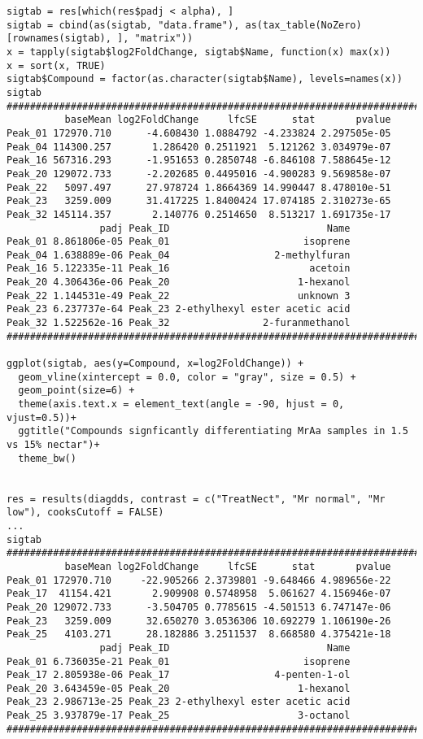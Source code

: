 \documentclass[]{article}
\begin{document}
\begin{verbatim}
sigtab = res[which(res$padj < alpha), ]
sigtab = cbind(as(sigtab, "data.frame"), as(tax_table(NoZero)[rownames(sigtab), ], "matrix"))
x = tapply(sigtab$log2FoldChange, sigtab$Name, function(x) max(x))
x = sort(x, TRUE)
sigtab$Compound = factor(as.character(sigtab$Name), levels=names(x))
sigtab
######################################################################################################
          baseMean log2FoldChange     lfcSE      stat       pvalue
Peak_01 172970.710      -4.608430 1.0884792 -4.233824 2.297505e-05
Peak_04 114300.257       1.286420 0.2511921  5.121262 3.034979e-07
Peak_16 567316.293      -1.951653 0.2850748 -6.846108 7.588645e-12
Peak_20 129072.733      -2.202685 0.4495016 -4.900283 9.569858e-07
Peak_22   5097.497      27.978724 1.8664369 14.990447 8.478010e-51
Peak_23   3259.009      31.417225 1.8400424 17.074185 2.310273e-65
Peak_32 145114.357       2.140776 0.2514650  8.513217 1.691735e-17
                padj Peak_ID                           Name
Peak_01 8.861806e-05 Peak_01                       isoprene
Peak_04 1.638889e-06 Peak_04                  2-methylfuran
Peak_16 5.122335e-11 Peak_16                        acetoin
Peak_20 4.306436e-06 Peak_20                      1-hexanol
Peak_22 1.144531e-49 Peak_22                      unknown 3
Peak_23 6.237737e-64 Peak_23 2-ethylhexyl ester acetic acid
Peak_32 1.522562e-16 Peak_32                2-furanmethanol
#####################################################################################################

ggplot(sigtab, aes(y=Compound, x=log2FoldChange)) + 
  geom_vline(xintercept = 0.0, color = "gray", size = 0.5) +
  geom_point(size=6) + 
  theme(axis.text.x = element_text(angle = -90, hjust = 0, vjust=0.5))+
  ggtitle("Compounds signficantly differentiating MrAa samples in 1.5 vs 15% nectar")+
  theme_bw()


res = results(diagdds, contrast = c("TreatNect", "Mr normal", "Mr low"), cooksCutoff = FALSE)
...
sigtab
######################################################################################
          baseMean log2FoldChange     lfcSE      stat       pvalue
Peak_01 172970.710     -22.905266 2.3739801 -9.648466 4.989656e-22
Peak_17  41154.421       2.909908 0.5748958  5.061627 4.156946e-07
Peak_20 129072.733      -3.504705 0.7785615 -4.501513 6.747147e-06
Peak_23   3259.009      32.650270 3.0536306 10.692279 1.106190e-26
Peak_25   4103.271      28.182886 3.2511537  8.668580 4.375421e-18
                padj Peak_ID                           Name
Peak_01 6.736035e-21 Peak_01                       isoprene
Peak_17 2.805938e-06 Peak_17                  4-penten-1-ol
Peak_20 3.643459e-05 Peak_20                      1-hexanol
Peak_23 2.986713e-25 Peak_23 2-ethylhexyl ester acetic acid
Peak_25 3.937879e-17 Peak_25                      3-octanol
########################################################################################


\end{verbatim}
\end{document}
